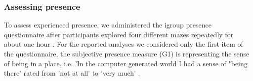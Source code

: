 \subsubsection{Assessing presence} To assess experienced presence, we administered the igroup presence questionnaire after participants explored four different mazes repeatedly for about one hour \cite{Schubert2003}. For the reported analyses we considered only the first item of the questionnaire, the subjective presence measure (G1) is representing the sense of being in a place, i.e. 'In the computer generated world I had a sense of "being there' rated from 'not at all' to 'very much' \cite{Schubert2003, Slater1993}.